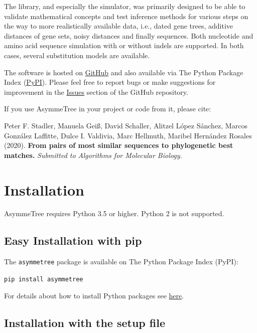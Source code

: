 \documentclass[hidelinks,11pt]{article}
\newcommand{\COMMANDLINE}[1]{\begingroup\par\vspace{3mm}\color{darkgrey}\begin{adjustwidth}{1cm}{1cm}\texttt{#1}\end{adjustwidth}\vspace{3mm}\endgroup}
\begin{document}
The library, and especially the simulator, was primarily designed to be able to validate mathematical concepts and test inference methods for various steps on the way to more realistically available data, i.e., dated gene trees, additive distances of gene sets, noisy distances and finally sequences.
Both nucleotide and amino acid sequence simulation with or without indels are supported. In both cases, several substitution models are available.

The software is hosted on \href{https://github.com/david-schaller/AsymmeTree}{GitHub} and also available via The Python Package Index (\href{https://pypi.org/project/asymmetree/}{PyPI}).
Please feel free to report bugs or make suggestions for improvement in the \href{https://github.com/david-schaller/AsymmeTree/issues}{Issues} section of the GitHub repository.

If you use AsymmeTree in your project or code from it, please cite:

\vspace{3mm}
\begin{adjustwidth}{1cm}{1cm}
	Peter F. Stadler, Manuela Gei{\ss}, David Schaller, Alitzel L{\'o}pez S{\'a}nchez, Marcos Gonz{\'a}lez Laffitte, Dulce I. Valdivia, Marc Hellmuth, Maribel Hern{\'a}ndez Rosales (2020). \textbf{From pairs of most similar sequences to phylogenetic best matches.} \textit{Submitted to Algorithms for Molecular Biology.}
\end{adjustwidth}
\vspace{3mm}


\section{Installation}

AsymmeTree requires Python 3.5 or higher. Python 2 is not supported.

\subsection{Easy Installation with pip}


The \texttt{asymmetree} package is available on The Python Package Index (PyPI):

\COMMANDLINE{pip install asymmetree}

\noindent
For details about how to install Python packages see
\href{https://packaging.python.org/tutorials/installing-packages/}{here}.

\subsection{Installation with the setup file}
\end{document}
